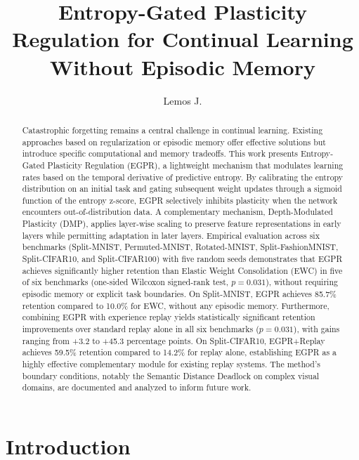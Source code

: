 \documentclass[11pt,a4paper]{article}
\title{Entropy-Gated Plasticity Regulation for Continual Learning\\Without Episodic Memory}
\author{Lemos J.}
\affil{Independent Researcher}
\date{}
\begin{document}
\maketitle

\begin{abstract}
Catastrophic forgetting remains a central challenge in continual learning. Existing approaches based on regularization or episodic memory offer effective solutions but introduce specific computational and memory tradeoffs. This work presents Entropy-Gated Plasticity Regulation (EGPR), a lightweight mechanism that modulates learning rates based on the temporal derivative of predictive entropy. By calibrating the entropy distribution on an initial task and gating subsequent weight updates through a sigmoid function of the entropy z-score, EGPR selectively inhibits plasticity when the network encounters out-of-distribution data. A complementary mechanism, Depth-Modulated Plasticity (DMP), applies layer-wise scaling to preserve feature representations in early layers while permitting adaptation in later layers. Empirical evaluation across six benchmarks (Split-MNIST, Permuted-MNIST, Rotated-MNIST, Split-FashionMNIST, Split-CIFAR10, and Split-CIFAR100) with five random seeds demonstrates that EGPR achieves significantly higher retention than Elastic Weight Consolidation (EWC) in five of six benchmarks (one-sided Wilcoxon signed-rank test, $p = 0.031$), without requiring episodic memory or explicit task boundaries. On Split-MNIST, EGPR achieves 85.7\% retention compared to 10.0\% for EWC, without any episodic memory. Furthermore, combining EGPR with experience replay yields statistically significant retention improvements over standard replay alone in all six benchmarks ($p = 0.031$), with gains ranging from +3.2 to +45.3 percentage points. On Split-CIFAR10, EGPR+Replay achieves 59.5\% retention compared to 14.2\% for replay alone, establishing EGPR as a highly effective complementary module for existing replay systems. The method's boundary conditions, notably the Semantic Distance Deadlock on complex visual domains, are documented and analyzed to inform future work.
\end{abstract}

\section{Introduction}
\end{document}
